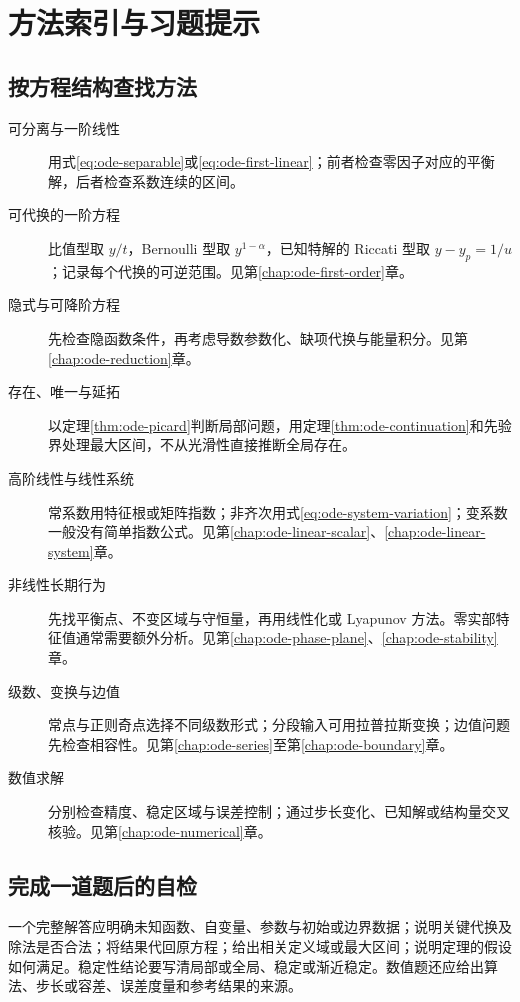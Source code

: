 \setcounter{chapter}{2} %
\chapter{方法索引与习题提示}
\label{app:ode-methods}

\section{按方程结构查找方法}
\begin{description}
 \item[可分离与一阶线性] 用式\eqref{eq:ode-separable}或\eqref{eq:ode-first-linear}；前者检查零因子对应的平衡解，后者检查系数连续的区间。
 \item[可代换的一阶方程] 比值型取 $y/t$，Bernoulli 型取 $y^{1-\alpha}$，已知特解的 Riccati 型取 $y-y_p=1/u$；记录每个代换的可逆范围。见第\ref{chap:ode-first-order}章。
 \item[隐式与可降阶方程] 先检查隐函数条件，再考虑导数参数化、缺项代换与能量积分。见第\ref{chap:ode-reduction}章。
 \item[存在、唯一与延拓] 以定理\ref{thm:ode-picard}判断局部问题，用定理\ref{thm:ode-continuation}和先验界处理最大区间，不从光滑性直接推断全局存在。
 \item[高阶线性与线性系统] 常系数用特征根或矩阵指数；非齐次用式\eqref{eq:ode-system-variation}；变系数一般没有简单指数公式。见第\ref{chap:ode-linear-scalar}、\ref{chap:ode-linear-system}章。
 \item[非线性长期行为] 先找平衡点、不变区域与守恒量，再用线性化或 Lyapunov 方法。零实部特征值通常需要额外分析。见第\ref{chap:ode-phase-plane}、\ref{chap:ode-stability}章。
 \item[级数、变换与边值] 常点与正则奇点选择不同级数形式；分段输入可用拉普拉斯变换；边值问题先检查相容性。见第\ref{chap:ode-series}至第\ref{chap:ode-boundary}章。
 \item[数值求解] 分别检查精度、稳定区域与误差控制；通过步长变化、已知解或结构量交叉核验。见第\ref{chap:ode-numerical}章。
\end{description}

\section{完成一道题后的自检}
一个完整解答应明确未知函数、自变量、参数与初始或边界数据；说明关键代换及除法是否合法；将结果代回原方程；给出相关定义域或最大区间；说明定理的假设如何满足。稳定性结论要写清局部或全局、稳定或渐近稳定。数值题还应给出算法、步长或容差、误差度量和参考结果的来源。

